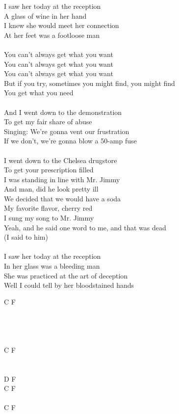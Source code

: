 \documentclass[a5paper, 10pt]{book}
\begin{document}
\begin{minipage}[t]{0.8\textwidth}
  I saw her today at the reception\\
  A glass of wine in her hand\\
  I knew she would meet her connection\\
  At her feet was a footloose man\\
  \\
  \hspace*{5mm}You can't always get what you want				\\
  \hspace*{5mm}You can't always get what you want\\
  \hspace*{5mm}You can't always get what you want\\
  \hspace*{5mm}But if you try, sometimes you might find, you might find\\
  \hspace*{5mm}You get what you need		\\
  \\
  And I went down to the demonstration\\
  To get my fair share of abuse\\
  Singing: We're gonna vent our frustration\\
  If we don't, we're gonna blow a 50-amp fuse\\
  \\
  I went down to the Chelsea drugstore\\
  To get your prescription filled\\
  I was standing in line with Mr. Jimmy\\
  And man, did he look pretty ill\\
  We decided that we would have a soda\\
  My favorite flavor, cherry red\\
  I sung my song to Mr. Jimmy\\
  Yeah, and he said one word to me, and that was dead\\
  (I said to him)\\
  \\
  I saw her today at the reception\\
  In her glass was a bleeding man\\
  She was practiced at the art of deception\\
  Well I could tell by her bloodstained hands\\
\end{minipage}
\begin{minipage}[t]{0.2\textwidth}
  C F\\
  ~\\
  ~\\
  ~\\
  ~\\
  C F\\
  ~\\
  ~\\
  D F\\
  C F\\
  \\
  C F\\
\end{minipage}
\end{document}
